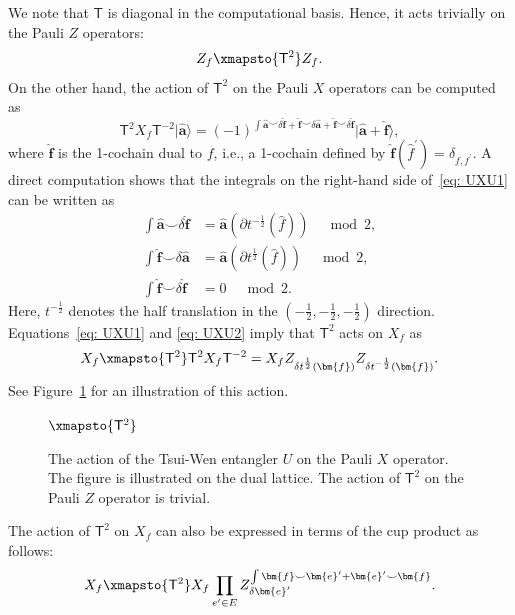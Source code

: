\documentclass[aps,twocolumn,prx,floatfix,preprintnumbers, nofootinbib,10pt]{revtex4-2}
\numberwithin{equation}{section}
\theoremstyle{definition}
\theoremstyle{remark}
\theoremstyle{claim}
\def\ket#1{{|{#1}\rangle}}
\renewcommand{\sf}[1]{\mathsf{#1}}
\begin{document}
We note that $\sf{T}$ is diagonal in the computational basis.
Hence, it acts trivially on the Pauli $Z$ operators:
\begin{equation}
Z_f \xmapsto{\sf{T}^2} Z_f.
\label{eq: UZ}
\end{equation}
On the other hand, the action of $\sf{T}^2$ on the Pauli $X$ operators can be computed as
\begin{equation}
\sf{T}^2 X_f \sf{T}^{-2} \ket{\hat{\bm{a}}} = (-1)^{\int \hat{\bm{a}} \smile \delta \hat{\bm{f}} + \hat{\bm{f}} \smile \delta \hat{\bm{a}} + \hat{\bm{f}} \smile \delta \hat{\bm{f}}} \ket{\hat{\bm{a}}+\bm{\hat{\bm{f}}}},
\label{eq: UXU1}
\end{equation}
where $\hat{\bm{f}}$ is the 1-cochain dual to $f$, i.e., a 1-cochain defined by $\hat{\bm{f}}(\hat{f}^{\prime}) = \delta_{f, f^{\prime}}$.
A direct computation shows that the integrals on the right-hand side of~\eqref{eq: UXU1} can be written as
\begin{equation}
\begin{aligned}
\int \hat{\bm{a}} \smile \delta \hat{\bm{f}} &= \hat{\bm{a}}(\partial t^{-\frac{1}{2}}(\hat{f})) \quad \bmod 2, \\
\int \hat{\bm{f}} \smile \delta \hat{\bm{a}} &= \hat{\bm{a}}(\partial t^{\frac{1}{2}}(\hat{f})) \quad \bmod 2, \\
\int \hat{\bm{f}} \smile \delta \hat{\bm{f}} &= 0 \quad \bmod 2.
\end{aligned}
\label{eq: UXU2}
\end{equation}
Here, $t^{-\frac{1}{2}}$ denotes the half translation in the $(-\frac{1}{2}, -\frac{1}{2}, -\frac{1}{2})$ direction.
Equations~\eqref{eq: UXU1} and \eqref{eq: UXU2} imply that $\sf{T}^2$ acts on $X_f$ as
\begin{equation}
X_f \xmapsto{\sf{T}^2} \sf{T}^2 X_f \sf{T}^{-2} = X_f Z_{\delta t^{\frac{1}{2}}(\bm{f})} Z_{\delta t^{-\frac{1}{2}}(\bm{f})}.
\end{equation}
See Figure~\ref{fig: TW of order 2} for an illustration of this action.
\begin{figure}[t]
\centering
{}
$\xmapsto{\sf{T}^2}$
\caption{The action of the Tsui-Wen entangler $U$ on the Pauli $X$ operator. The figure is illustrated on the dual lattice. The action of $\sf{T}^2$ on the Pauli $Z$ operator is trivial.}
\label{fig: TW of order 2}
\end{figure}
The action of $\sf{T}^2$ on $X_f$ can also be expressed in terms of the cup product as follows:
\begin{equation}
X_f \xmapsto{\sf{T}^2} X_f \prod_{e^{\prime} \in E} Z_{\delta \bm{e}^{\prime}}^{\int \bm{f} \smile \bm{e}^{\prime} + \bm{e}^{\prime} \smile \bm{f}}.
\label{eq: UX}
\end{equation}
\end{document}
